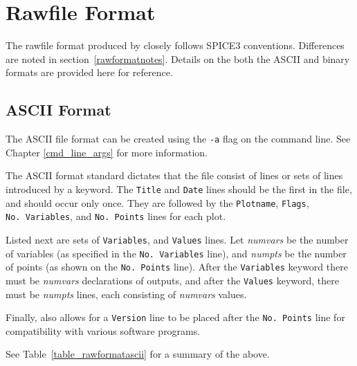 


\chapter{Rawfile Format}
\label{rawformat}

The rawfile format produced by \Xyce{} closely follows SPICE3
conventions.  Differences are noted in section~\ref{rawformatnotes}. 
Details on the both the ASCII and binary formats are provided here for
reference. 


\section{ASCII Format}
\label{rawformatascii}

The ASCII file format can be created using the \texttt{-a} flag on the command
line. See Chapter \ref{cmd_line_args} for more information.

The ASCII format standard dictates that the file consist of lines or sets of
lines introduced by a keyword. The \texttt{Title} and \texttt{Date} lines
should be the first in the file, and should occur only once. They are followed
by the \texttt{Plotname}, \texttt{Flags}, \texttt{No.~Variables}, and
\texttt{No.~Points} lines for each plot. 

Listed next are sets of \texttt{Variables}, and \texttt{Values} lines. Let
\emph{numvars} be the number of variables (as specified in the
\texttt{No.~Variables} line), and \emph{numpts} be the number of points (as
shown on the \texttt{No.~Points} line). After the \texttt{Variables} keyword
there must be \emph{numvars} declarations of outputs, and after the
\texttt{Values} keyword, there must be \emph{numpts} lines, each consisting of
\emph{numvars} values. 

Finally, \Xyce{} also allows for a \texttt{Version} line to be placed after the
\texttt{No.~Points} line for compatibility with various software programs.

See Table~\ref{table_rawformatascii} for a summary of the above.

